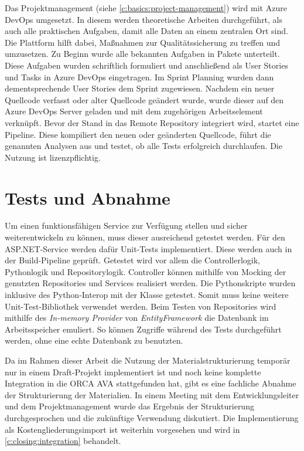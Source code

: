 Das Projektmanagement (siehe \autoref{c:basics:project-management}) wird mit Azure DevOps umgesetzt. In diesem werden theoretische Arbeiten durchgeführt, als auch alle praktischen Aufgaben, damit alle Daten an einem zentralen Ort sind. Die Plattform hilft dabei, Maßnahmen zur Qualitätssicherung zu treffen und umzusetzen. Zu Beginn wurde alle bekannten Aufgaben in Pakete unterteilt. Diese Aufgaben wurden schriftlich formuliert und anschließend als User Stories und Tasks in Azure DevOps eingetragen. Im Sprint Planning wurden dann dementsprechende User Stories dem Sprint zugewiesen. Nachdem ein neuer Quellcode verfasst oder alter Quellcode geändert wurde, wurde dieser auf den Azure DevOps Server geladen und mit dem zugehörigen Arbeitselement verknüpft. Bevor der Stand in das Remote Repository integriert wird, startet eine Pipeline. Diese kompiliert den neuen oder geänderten Quellcode, führt die genannten Analysen aus und testet, ob alle Tests erfolgreich durchlaufen. Die Nutzung ist lizenzpflichtig.

\section{Tests und Abnahme}
\label{c:qs:tests}
Um einen funktionsfähigen Service zur Verfügung stellen und sicher weiterentwickeln zu können, muss dieser ausreichend getestet werden. Für den ASP.NET-Service werden dafür Unit-Tests implementiert. Diese werden auch in der Build-Pipeline geprüft. Getestet wird vor allem die Controllerlogik, Pythonlogik und Repositorylogik. Controller können mithilfe von Mocking der genutzten Repositories und Services realisiert werden. Die Pythonskripte wurden inklusive des Python-Interop mit der Klasse  getestet. Somit muss keine weitere Unit-Test-Bibliothek verwendet werden. Beim Testen von Repositories wird mithilfe des \textit{In-memory Provider} von \textit{EntityFramework} die Datenbank im Arbeitsspeicher emuliert. So können Zugriffe während des Tests durchgeführt werden, ohne eine echte Datenbank zu benutzten.

Da im Rahmen dieser Arbeit die Nutzung der Materialstrukturierung temporär nur in einem Draft-Projekt implementiert ist und noch keine komplette Integration in die ORCA AVA stattgefunden hat, gibt es eine fachliche Abnahme der Strukturierung der Materialien. In einem Meeting mit dem Entwicklungsleiter und dem Projektmanagement wurde das Ergebnis der Strukturierung durchgesprochen und die zukünftige Verwendung diskutiert. Die Implementierung als Kostengliederungsimport ist weiterhin vorgesehen und wird in \autoref{c:closing:integration} behandelt.

